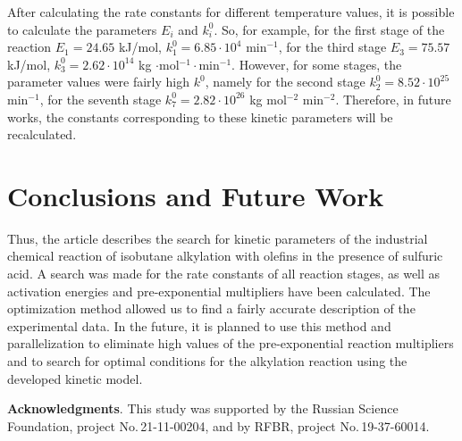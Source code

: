 \documentclass{svproc}
\begin{document}
After calculating the rate constants for different temperature values, it is possible to calculate the parameters $E_i$ and $k_i^0$. So, for example, for the first stage of the reaction $E_1 = 24.65$ kJ/mol, $k_1^0 = 6.85 \cdot 10^4$ min$^{-1}$, for the third stage $E_3 = 75.57$ kJ/mol, $k_3^0 = 2.62 \cdot 10^{14}$ kg $\cdot$mol$^{-1}\cdot$min$^{-1}$. However, for some stages, the parameter values were fairly high $k^0$, namely for the second stage $k_2^0 = 8.52 \cdot 10^{25}$ min$^{-1}$, for the seventh stage $k_7^0 = 2.82 \cdot 10^{26}$ kg mol$^{-2}$ min$^{-2}$. Therefore, in future works, the constants corresponding to these kinetic parameters will be recalculated.

\section{Conclusions and Future Work}
Thus, the article describes the search for kinetic parameters of the industrial chemical reaction of isobutane alkylation with olefins in the presence of sulfuric acid. A search was made for the rate constants of all reaction stages, as well as activation energies and pre-exponential multipliers have been calculated. The optimization method allowed us to find a fairly accurate description of the experimental data. In the future, it is planned to use this method and parallelization to eliminate high values of the pre-exponential reaction multipliers and to search for optimal conditions for the alkylation reaction using the developed kinetic model.

\medskip

\textbf{Acknowledgments}. This study was supported by the Russian Science Foundation, project No.\,21-11-00204, and by RFBR, project No.\,19-37-60014.

%
%

{}
\end{document}
